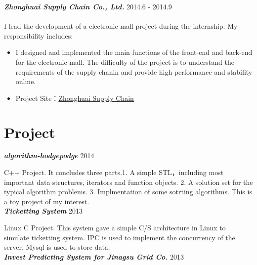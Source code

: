 \documentclass[10pt]{article} %
\begin{document}
\begin{minipage}[t]{0.6\textwidth}
{\bf \large \textit{Zhonghuai Supply Chain Co., Ltd.}} \hfill  \hfill {2014.6 - 2014.9\\}\\
{I lead the development of a electronic mall project during the internship. My responsibility includes:}
\begin{itemize} \itemsep -1pt
\item I designed and implemented the main functions of the front-end and back-end for the electronic mall. The difficulty of the project is to understand the requirements of the supply chanin and provide high performance and stability online.
\item Project Site：\href{http://www.zhchain.com}{Zhonghuai Supply Chain}
\end{itemize}



\section{Project}

{\bf \large \textit{algorithm-hodgepodge}} \hfill  \hfill {2014\\}

\normalsize{C++ Project. It concludes three parts.1. A simple STL，including most important data structures, iterators and function objects. 2. A solution set for the typical algorithm problems. 3. Implmentation of some sotrting algorithms. This is a toy project of my interest.}\\

{\bf \large \textit{Ticketting System}} \hfill  \hfill {2013\\}

\normalsize{Linux C Project. This system gave a simple C/S architecture in Linux to simulate ticketting system. IPC is used to implement the concurrency of the server. Mysql is used to store data.}\\


{\bf \large \textit{Invest Predicting System for Jinagsu Grid Co.}} \hfill  \hfill {2013\\}


\end{minipage}
\end{document}
